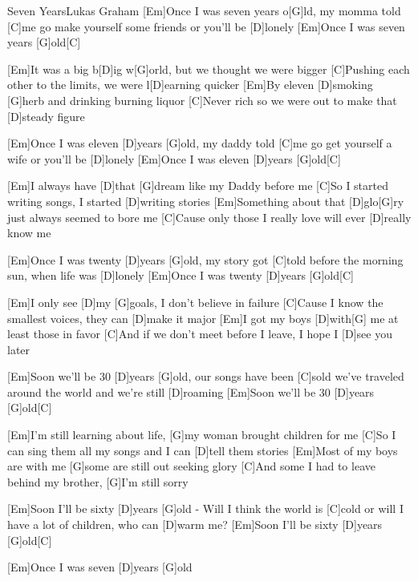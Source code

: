 \documentclass[../main.tex]{subfiles}
\begin{document}
\begin{song}{Seven Years}{Lukas Graham}{}
[Em]Once I was seven years o[G]ld, my momma told [C]me
go make yourself some friends or you'll be [D]lonely
[Em]Once I was seven years [G]old[C]{}

[Em]It was a big b[D]ig w[G]orld, but we thought we were bigger
[C]Pushing each other to the limits, we were l[D]earning quicker
[Em]By eleven [D]smoking [G]herb and drinking burning liquor
[C]Never rich so we were out to make that [D]steady figure

[Em]Once I was eleven [D]years [G]old, my daddy told [C]me
go get yourself a wife or you'll be [D]lonely
[Em]Once I was eleven [D]years [G]old[C]{}

[Em]I always have [D]that [G]dream like my Daddy before me
[C]So I started writing songs, I started [D]writing stories
[Em]Something about that [D]glo[G]ry just always seemed to bore me
[C]Cause only those I really love will ever [D]really know me

[Em]Once I was twenty [D]years [G]old, my story got [C]told
before the morning sun, when life was [D]lonely
[Em]Once I was twenty [D]years [G]old[C]{}

[Em]I only see [D]my [G]goals, I don't believe in failure
[C]Cause I know the smallest voices, they can [D]make it major
[Em]I got my boys [D]with[G] me at least those in favor
[C]And if we don't meet before I leave, I hope I [D]see you later

[Em]Soon we'll be 30 [D]years [G]old, our songs have been [C]sold
we've traveled around the world  and we're still [D]roaming
[Em]Soon we'll be 30 [D]years [G]old[C]{}

[Em]I'm still learning about life, [G]my woman brought children for me
[C]So I can sing them all my songs and I can [D]tell them stories
[Em]Most of my boys are with me [G]some are still out seeking glory
[C]And some I had to leave behind my brother, [G]I'm still sorry

[Em]Soon I'll be sixty [D]years [G]old - Will I think the world is [C]cold
or will I have a lot of children, who can [D]warm me?
[Em]Soon I'll be sixty [D]years [G]old[C]{}

[Em]Once I was seven [D]years [G]old
\end{song}
\end{document}
